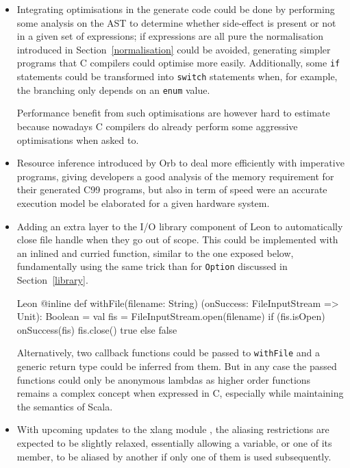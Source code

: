 \documentclass[a4paper,twoside]{article}
\newcommand{\InlineC}[1]{\lstinline[language=C99]|#1|}
\newcommand{\InlineS}[1]{\lstinline[language=Leon]|#1|}
\newcommand{\RefSec}[1]{Section~\ref{#1}}
\begin{document}
\renewcommand{\labelitemi}{$\diamond$}
\begin{itemize}

\item Integrating optimisations in the generate code could be done by performing
some analysis on the AST to determine whether side-effect is present or not in a
given set of expressions; if expressions are all pure the normalisation
introduced in \RefSec{normalisation} could be avoided, generating simpler
programs that C compilers could optimise more easily. Additionally, some
\InlineC{if} statements could be transformed into \InlineC{switch} statements
when, for example, the branching only depends on an \InlineC{enum} value.

Performance benefit from such optimisations are however hard to estimate because
nowadays C compilers do already perform some aggressive optimisations when asked
to.

\item Resource inference introduced by Orb \cite{Madhavan2014} to deal more
efficiently with imperative programs, giving developers a good analysis of the
memory requirement for their generated C99 programs, but also in term of speed
were an accurate execution model be elaborated for a given hardware system.

\item Adding an extra layer to the I/O library component of Leon to
automatically close file handle when they go out of scope. This could be
implemented with an inlined and curried function, similar to the one exposed
below, fundamentally using the same trick than for \InlineS{Option} discussed in
\RefSec{library}.

\begin{ShortCode}{Leon}
@inline
def withFile(filename: String)
            (onSuccess: FileInputStream => Unit): Boolean = {
  val fis = FileInputStream.open(filename)
  if (fis.isOpen) {
    onSuccess(fis)
    fis.close()
    true
  } else false
}
\end{ShortCode}

Alternatively, two callback functions could be passed to \InlineS{withFile} and
a generic return type could be inferred from them. But in any case the passed
functions could only be anonymous lambdas as higher order functions remains a
complex concept when expressed in C, especially while maintaining the semantics
of Scala.

\item With upcoming updates to the xlang module \cite{xlang}, the aliasing
restrictions are expected to be slightly relaxed, essentially allowing a
variable, or one of its member, to be aliased by another if only one of them is
used subsequently.


\end{itemize}
\end{document}
